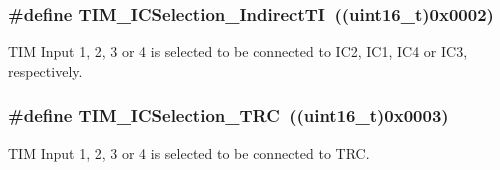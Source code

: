 \subsubsection[{T\+I\+M\+\_\+\+I\+C\+Selection\+\_\+\+Indirect\+T\+I}]{\setlength{\rightskip}{0pt plus 5cm}\#define T\+I\+M\+\_\+\+I\+C\+Selection\+\_\+\+Indirect\+T\+I~((uint16\+\_\+t)0x0002)}\label{group___t_i_m___input___capture___selection_ga2289b684133ac0b81ddfcd860d01b144}
T\+I\+M Input 1, 2, 3 or 4 is selected to be connected to I\+C2, I\+C1, I\+C4 or I\+C3, respectively. \hypertarget{group___t_i_m___input___capture___selection_ga2cd464e97ffd6ea3208ec65672f9a373}{}
\subsubsection[{T\+I\+M\+\_\+\+I\+C\+Selection\+\_\+\+T\+R\+C}]{\setlength{\rightskip}{0pt plus 5cm}\#define T\+I\+M\+\_\+\+I\+C\+Selection\+\_\+\+T\+R\+C~((uint16\+\_\+t)0x0003)}\label{group___t_i_m___input___capture___selection_ga2cd464e97ffd6ea3208ec65672f9a373}
T\+I\+M Input 1, 2, 3 or 4 is selected to be connected to T\+R\+C. 